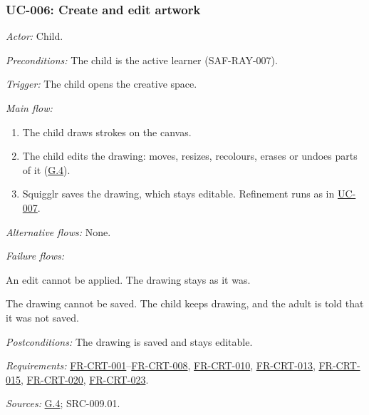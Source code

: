 \documentclass[12pt]{article}
\renewcommand{\_}{\textunderscore\allowbreak}%
\newcommand{\goalref}[1]{\hyperref[goal:#1]{G.#1}}
\newcommand{\ucref}[1]{\hyperref[uc:#1]{\mbox{UC-#1}}}
\newcommand{\reqfield}[2]{\noindent\textit{#1:} #2\par}
\newcommand{\reqref}[1]{\hyperref[req:#1]{#1}}
\providecommand{\ucref}[1]{\hyperref[uc:#1]{UC-#1}}
\begin{document}
\subsubsection{UC-006: Create and edit artwork}
\label{puc:006}
\reqfield{Actor}{Child.}
\reqfield{Preconditions}{The child is the active learner (\mbox{SAF-RAY-007}).}
\reqfield{Trigger}{The child opens the creative space.}
\noindent\textit{Main flow:}
\begin{enumerate}[nosep, leftmargin=2.2em]
  \item The child draws strokes on the canvas.
  \item The child edits the drawing: moves, resizes, recolours, erases or undoes
  parts of it (\goalref{4}).
  \item Squigglr saves the drawing, which stays editable. Refinement runs as in
  \ucref{007}.
\end{enumerate}
\noindent\textit{Alternative flows:} None.
\par
\noindent\textit{Failure flows:}
\begin{description}[nosep, leftmargin=2.2em, font=\normalfont]
  \item[2a.] An edit cannot be applied. The drawing stays as it was.
  \item[3a.] The drawing cannot be saved. The child keeps drawing, and the adult
  is told that it was not saved.
\end{description}
\reqfield{Postconditions}{The drawing is saved and stays editable.}
\reqfield{Requirements}{\reqref{FR-CRT-001}--\reqref{FR-CRT-008},
\reqref{FR-CRT-010}, \reqref{FR-CRT-013}, \reqref{FR-CRT-015},
\reqref{FR-CRT-020}, \reqref{FR-CRT-023}.} \reqfield{Sources}{\goalref{4};
\mbox{SRC-009.01}.}
\end{document}
